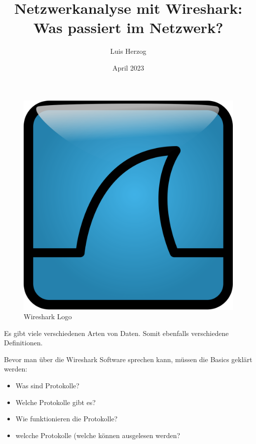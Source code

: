 \documentclass[12pt]{article}
\title{Netzwerkanalyse mit Wireshark: Was passiert im Netzwerk?}
\author{Luis Herzog}
\date{April 2023}
\begin{document}

\maketitle


\thispagestyle{empty}

\begin{figure}[h]
	\centering
	\includegraphics[scale=0.1]{Bilder/Wireshark_icon.svg.png}
	\caption{Wireshark Logo}
	\label{fig:figure1}
\end{figure}


\newpage
\tableofcontents
\newpage

Es gibt viele verschiedenen Arten von Daten. Somit ebenfalls verschiedene Definitionen. 

Bevor man über die Wireshark Software sprechen kann, müssen die Basics geklärt werden:

\begin{itemize}
	\item Was sind Protokolle?
	\item Welche Protokolle gibt es?
	\item Wie funktionieren die Protokolle?
	\item welcche Protokolle (welche können ausgelesen werden?
\end{itemize}
\end{document}
